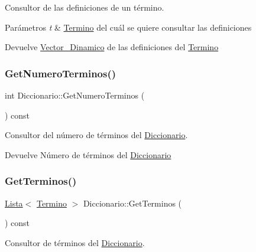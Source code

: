 Consultor de las definiciones de un término. 


\begin{DoxyParams}{Parámetros}
{\em t} & \mbox{\hyperlink{classTermino}{Termino}} del cuál se quiere consultar las definiciones \\
\hline
\end{DoxyParams}
\begin{DoxyReturn}{Devuelve}
\mbox{\hyperlink{classVector__Dinamico}{Vector\+\_\+\+Dinamico}} de las definiciones del \mbox{\hyperlink{classTermino}{Termino}} 
\end{DoxyReturn}
\mbox{\label{classDiccionario_a52ee9ad6a4b58befe9c3603e405cb360}} 
\subsubsection{\texorpdfstring{GetNumeroTerminos()}{GetNumeroTerminos()}}
{\footnotesize\ttfamily int Diccionario\+::\+Get\+Numero\+Terminos (\begin{DoxyParamCaption}{ }\end{DoxyParamCaption}) const}



Consultor del número de términos del \mbox{\hyperlink{classDiccionario}{Diccionario}}. 

\begin{DoxyReturn}{Devuelve}
Número de términos del \mbox{\hyperlink{classDiccionario}{Diccionario}} 
\end{DoxyReturn}
\mbox{\label{classDiccionario_a4b04ecb76099d4217e5bb98ba6b28b70}} 
\subsubsection{\texorpdfstring{GetTerminos()}{GetTerminos()}}
{\footnotesize\ttfamily \mbox{\hyperlink{classLista}{Lista}}$<$ \mbox{\hyperlink{classTermino}{Termino}} $>$ Diccionario\+::\+Get\+Terminos (\begin{DoxyParamCaption}{ }\end{DoxyParamCaption}) const}



Consultor de términos del \mbox{\hyperlink{classDiccionario}{Diccionario}}. 

